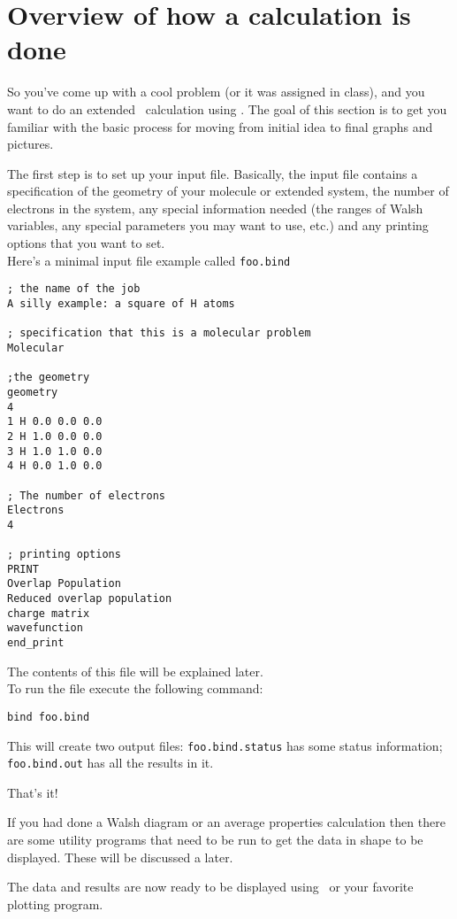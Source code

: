 \chapter{Overview of how a calculation is done}

So you've come up with a cool problem (or it was assigned in class),
and you want to do an extended \huek\ calculation using \prog.  The
goal of this section is to get you familiar with the basic process for
moving from initial idea to final graphs and pictures.

The first step is to set up your input file. 
Basically, the input file contains a specification of the 
geometry of your molecule or extended system,
 the number of electrons in the system, any special information needed 
(the ranges of Walsh variables, any special parameters you may want to use,
 etc.) and any printing options that you want to set. \\[0.1in]



\noindent Here's a minimal input file example called {\tt foo.bind}


\shrinkspacing
\begin{verbatim}
; the name of the job
A silly example: a square of H atoms

; specification that this is a molecular problem
Molecular

;the geometry
geometry
4
1 H 0.0 0.0 0.0
2 H 1.0 0.0 0.0
3 H 1.0 1.0 0.0
4 H 0.0 1.0 0.0

; The number of electrons
Electrons
4

; printing options
PRINT
Overlap Population
Reduced overlap population
charge matrix
wavefunction
end_print
\end{verbatim}
\resumespacing


\noindent The contents of this file will be explained later. \\[0.1in]

\noindent To run the file execute the following command:

{\tt bind foo.bind}

This will create two output files: {\tt foo.bind.status} has some
status information; {\tt foo.bind.out} has all the results in it.

That's it!

If you had done a Walsh diagram or an average properties calculation
then there are some utility programs that need to be run to get the
data in shape to be displayed.  These will be discussed a later.

The data and results are now ready to be displayed using \viewprog\ or
your favorite plotting program.
